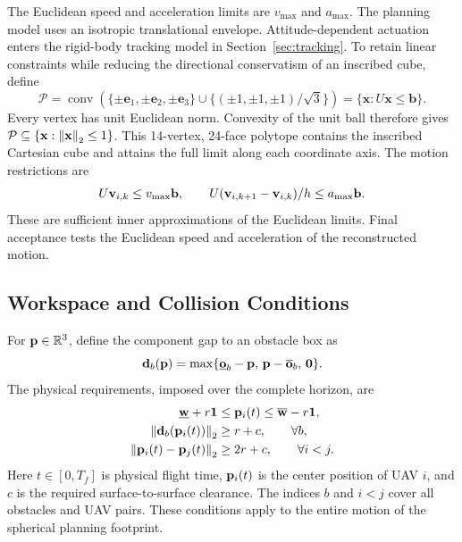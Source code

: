 The Euclidean speed and acceleration limits are $v_{\max}$ and $a_{\max}$. The planning model uses an isotropic translational envelope. Attitude-dependent actuation enters the rigid-body tracking model in Section~\ref{sec:tracking}.
To retain linear constraints while reducing the directional conservatism of an inscribed cube, define
\begin{equation}
 \mathcal P=\operatorname{conv}\!\left(\{\pm\mathbf e_1,\pm\mathbf e_2,\pm\mathbf e_3\}
 \cup\{(\pm1,\pm1,\pm1)/\sqrt3\}\right)
 =\{\mathbf x:U\mathbf x\leq\mathbf b\}.
 \label{eq:polytope}
\end{equation}
Every vertex has unit Euclidean norm. Convexity of the unit ball therefore gives $\mathcal P\subseteq\{\mathbf x:\left\lVert \mathbf x\right\rVert_2\leq1\}$. This 14-vertex, 24-face polytope contains the inscribed Cartesian cube and attains the full limit along each coordinate axis. The motion restrictions are
\begin{equation}
 U\mathbf{v}_{i,k}\leq v_{\max}\mathbf b,\qquad
 U(\mathbf{v}_{i,k+1}-\mathbf{v}_{i,k})/h\leq a_{\max}\mathbf b.
 \label{eq:bounds}
\end{equation}
These are sufficient inner approximations of the Euclidean limits. Final acceptance tests the Euclidean speed and acceleration of the reconstructed motion.

\subsection{Workspace and Collision Conditions}
For $\mathbf{p}\in\mathbb{R}^3$, define the component gap to an obstacle box as
\begin{equation}
 \mathbf d_b(\mathbf{p})=\max\{\underline{\mathbf o}_b-\mathbf{p},\,
 \mathbf{p}-\overline{\mathbf o}_b,\,\mathbf0\}.
 \label{eq:gap}
\end{equation}
The physical requirements, imposed over the complete horizon, are
\begin{subequations}\label{eq:avoidance}\begin{align}
 \underline{\mathbf w}+r\mathbf{1}&\leq\mathbf{p}_i(t)\leq\overline{\mathbf w}-r\mathbf{1},\\
 \left\lVert \mathbf d_b(\mathbf{p}_i(t))\right\rVert_2&\geq r+c,\qquad \forall b,\\
 \left\lVert \mathbf{p}_i(t)-\mathbf{p}_j(t)\right\rVert_2&\geq 2r+c,\qquad \forall i<j.
\end{align}\end{subequations}
Here $t\in[0,T_f]$ is physical flight time, $\mathbf{p}_i(t)$ is the center position of UAV $i$, and $c$ is the required surface-to-surface clearance. The indices $b$ and $i<j$ cover all obstacles and UAV pairs. These conditions apply to the entire motion of the spherical planning footprint.

